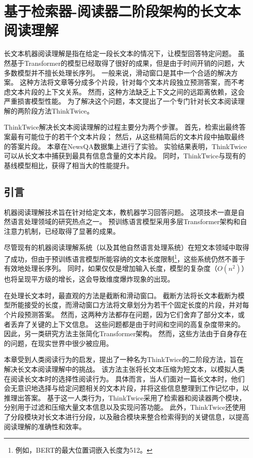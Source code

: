 \chapter{基于检索器-阅读器二阶段架构的长文本阅读理解}
长文本机器阅读理解是指在给定一段长文本的情况下，让模型回答特定问题。
虽然基于Transformer的模型已经取得了很好的成果，但是由于时间开销的问题，大多数模型并不擅长处理长序列。
一般来说，滑动窗口是其中一个合适的解决方案。
这种方法将文章等分成多个片段，针对每个文本片段独立预测答案，而不考虑文本片段的上下文关系。
然而，这种方法缺乏上下文之间的远距离依赖，这会严重损害模型性能。
为了解决这个问题，本文提出了一个专门针对长文本阅读理解的两阶段方法ThinkTwice。

ThinkTwice解决长文本阅读理解的过程主要分为两个步骤。
首先，检索出最终答案最有可能位于的若干个文本片段；
然后，从这些精简后的文本片段中抽取最终的答案片段。
本章在NewsQA数据集上进行了实验。
实验结果表明，ThinkTwice可以从长文本中捕获到最具有信息含量的文本片段。
同时，ThinkTwice与现有的基线模型相比，获得了相当大的性能提升。

\section{引言}
机器阅读理解技术\cite{hermann2015teaching}旨在针对给定文本，教机器学习回答问题。
这项技术一直是自然语言处理领域的研究热点之一。
预训练语言模型采用多层Transformer架构和自注意力机制\cite{vaswani2017attention}，已经取得了显著的成果。

尽管现有的机器阅读理解系统（以及其他自然语言处理系统）在短文本领域中取得了成功，但由于预训练语言模型所能容纳的文本长度限制\footnote{例如，BERT的最大位置词嵌入长度为512。}，这些系统仍然不善于有效地处理长序列。
同时，如果仅仅是增加输入长度，模型的复杂度（$O(n^2)$）也将呈现平方级的增长，这会导致维度爆炸现象的出现。

在处理长文本时，最直观的方法是截断\cite{rajpurkar2016squad,xie2019unsupervised}和滑动窗口\cite{joshi2019bert}。
截断方法将长文本截断为模型所能接受的长度，而滑动窗口方法将文章划分为若干个固定长度的片段，并对每个片段预测答案。
然而，这两种方法都存在问题，因为它们舍弃了部分文本，或者丢弃了关键的上下文信息。
这些问题都是由于时间和空间的高复杂度带来的。
因此，另一类研究方法主张简化Transformer架构\cite{beltagy2020longformer,zaheer2020big,ding2020ernie}。
然而，这些方法由于自身存在的问题，在现实世界中很少被应用。

本章受到人类阅读行为的启发，提出了一种名为ThinkTwice的二阶段方法，旨在解决长文本阅读理解中的挑战。
该方法主张将长文本压缩为短文本，以模拟人类在阅读长文本时的选择性阅读行为。
具体而言，当人们面对一篇长文本时，他们会无意识地选择与给定问题相关的文本片段，并将这些信息整理到工作记忆\cite{atkinson1968human}中，以推理出答案。
基于这一人类行为，ThinkTwice采用了检索器和阅读器两个模块，分别用于过滤和压缩大量文本信息以及实现问答功能。
此外，ThinkTwice还使用了分段模块对长文本进行分段，以及融合模块来整合检索得到的关键信息，以提高阅读理解的准确性和效率。

